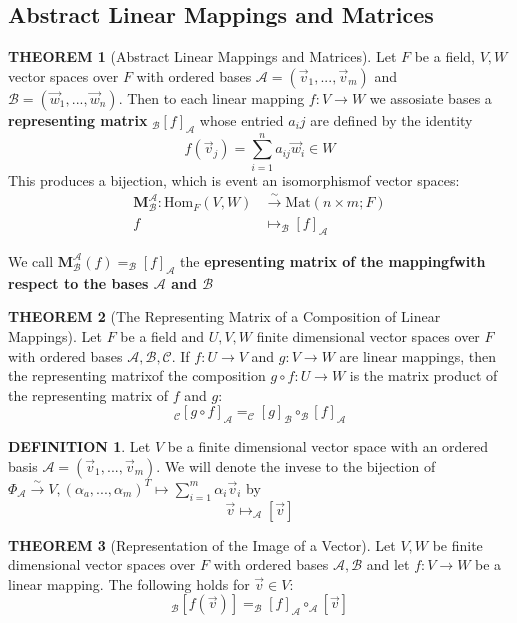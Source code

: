 \documentclass[10pt]{article}
\theoremstyle{definition}
\newtheorem{definition}{DEFINITION}[subsection]
\newtheorem{theorem}{THEOREM}[subsection]
\newcommand{\Hom}{\text{Hom}}
\newcommand{\Mat}{\text{Mat}}
\begin{document}
\subsection{Abstract Linear Mappings and Matrices}
\begin{theorem}[Abstract  Linear  Mappings  and  Matrices]
    Let $F$ be a field, $V,W$ vector spaces over $F$ with ordered bases $\mathcal{A} = (\vec{v}_1,...,\vec{v}_m)$ and $\mathcal{B} = (\vec{w}_1,...,\vec{w}_n)$. Then to each linear mapping $f:V\rightarrow W$ we assosiate bases a \textbf{representing matrix} $_\mathcal{B}[f]_\mathcal{A}$ whose entried $a_ij$ are defined by the identity $$f(\vec{v}_j) = \sum_{i=1}^n{a_{ij}\vec{w}_i}\in W$$
    This produces a bijection, which is event an isomorphismof vector spaces:
    \[\begin{split}
        \textbf{M}_\mathcal{B}^\mathcal{A}: \Hom_F(V,W) &\stackrel{\sim}{\rightarrow} \Mat(n \times m; F)\\
        f &\mapsto _\mathcal{B}[f]_\mathcal{A} 
    \end{split}\]
\end{theorem}
We call $\textbf{M}_\mathcal{B}^\mathcal{A}(f) = _\mathcal{B}[f]_\mathcal{A}$ the \textbf{epresenting matrix of the mappingfwith respect to the bases $\mathcal{A}$ and $\mathcal{B}$}

\begin{theorem}[The Representing Matrix of a Composition of Linear Mappings]
    Let $F$ be a field and $U,V,W$ finite dimensional vector spaces over $F$ with ordered bases $\mathcal{A,B,C}$. If $f:U\rightarrow V$ and $g:V \rightarrow W$ are linear mappings, then the representing matrixof the composition $g \circ f: U \rightarrow W$ is the matrix product of the representing matrix of $f$ and $g$: $$_\mathcal{C}[g\circ f]_\mathcal{A} = _\mathcal{C}[g]_\mathcal{B} \circ _\mathcal{B}[f]_\mathcal{A}$$
\end{theorem}

\begin{definition}
    Let $V$ be a finite dimensional vector space with an ordered basis $\mathcal{A} = (\vec{v}_1,...,\vec{v}_m)$. We will denote the invese to the bijection of $\Phi_\mathcal{A} \stackrel{\sim}{\rightarrow} V,(\alpha_a,...,\alpha_m)^T \mapsto \sum_{i=1}^m{\alpha_i\vec{v}_i}$ by
    $$\vec{v} \mapsto _\mathcal{A}[\vec{v}]$$
\end{definition}

\begin{theorem}[Representation of the Image of a Vector]
    Let $V,W$ be finite dimensional vector spaces over $F$ with ordered bases $\mathcal{A,B}$ and let $f:V\rightarrow W$ be a linear mapping. The following holds for $\vec{v} \in V$:
    $$_\mathcal{B}[f(\vec{v})] = _\mathcal{B}[f]_\mathcal{A} \circ _\mathcal{A}[\vec{v}]$$
\end{theorem}
\end{document}
